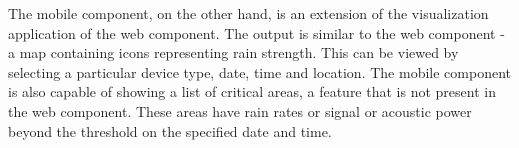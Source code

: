 \bigskip
The mobile component, on the other hand, is an extension of the visualization application of the web component. The output is similar to the web component - a map containing icons representing rain strength. This can be viewed by selecting a particular device type, date, time and location. The mobile component is also capable of showing a list of critical areas, a feature that is not present in the web component. These areas have rain rates or signal or acoustic power beyond the threshold on the specified date and time. 

